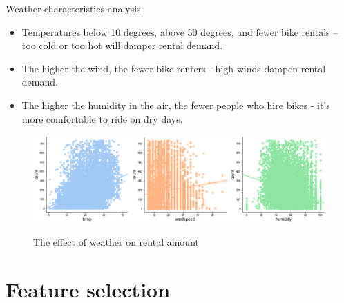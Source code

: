\documentclass[
 size=14pt,
 paper=smartboard,  %
 mode=present, 		%
 display=slides, 	%
 style=tuliplab,  	%
 pauseslide,
 fleqn,leqno]{powerdot}
\begin{document}
\begin{slide}{Weather characteristics analysis}
  \begin{itemize}
    \item
    Temperatures below 10 degrees, above 30 degrees, and fewer bike rentals -- too cold or too hot will damper rental demand. 
    \item
    The higher the wind, the fewer bike renters - high winds dampen rental demand.
    \item
    The higher the humidity in the air, the fewer people who hire bikes - it's more comfortable to ride on dry days.
    \end{itemize}
  \vspace{-1.5cm}
  \begin{figure}
    \centering
    \includegraphics[width=1\textwidth]{figures//weather.eps}\\
    \caption{The effect of weather on rental amount} \label{framework}
  \end{figure}
      
      
\end{slide}
\section{Feature selection}
\end{document}
